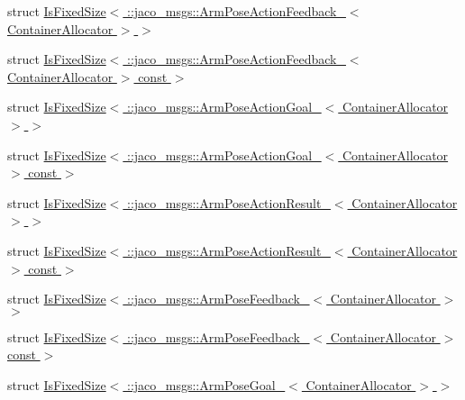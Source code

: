 \begin{DoxyCompactItemize}
\item 
struct \hyperlink{structros_1_1message__traits_1_1IsFixedSize_3_01_1_1jaco__msgs_1_1ArmPoseActionFeedback___3_01ContainerAllocator_01_4_01_4}{Is\+Fixed\+Size$<$ \+::jaco\+\_\+msgs\+::\+Arm\+Pose\+Action\+Feedback\+\_\+$<$ Container\+Allocator $>$ $>$}
\item 
struct \hyperlink{structros_1_1message__traits_1_1IsFixedSize_3_01_1_1jaco__msgs_1_1ArmPoseActionFeedback___3_01Co52ad99d0f62f41acb9d98cf1b57f7795}{Is\+Fixed\+Size$<$ \+::jaco\+\_\+msgs\+::\+Arm\+Pose\+Action\+Feedback\+\_\+$<$ Container\+Allocator $>$ const  $>$}
\item 
struct \hyperlink{structros_1_1message__traits_1_1IsFixedSize_3_01_1_1jaco__msgs_1_1ArmPoseActionGoal___3_01ContainerAllocator_01_4_01_4}{Is\+Fixed\+Size$<$ \+::jaco\+\_\+msgs\+::\+Arm\+Pose\+Action\+Goal\+\_\+$<$ Container\+Allocator $>$ $>$}
\item 
struct \hyperlink{structros_1_1message__traits_1_1IsFixedSize_3_01_1_1jaco__msgs_1_1ArmPoseActionGoal___3_01Contai6ea5b7e7c9d1480f340bdea939ca66b5}{Is\+Fixed\+Size$<$ \+::jaco\+\_\+msgs\+::\+Arm\+Pose\+Action\+Goal\+\_\+$<$ Container\+Allocator $>$ const  $>$}
\item 
struct \hyperlink{structros_1_1message__traits_1_1IsFixedSize_3_01_1_1jaco__msgs_1_1ArmPoseActionResult___3_01ContainerAllocator_01_4_01_4}{Is\+Fixed\+Size$<$ \+::jaco\+\_\+msgs\+::\+Arm\+Pose\+Action\+Result\+\_\+$<$ Container\+Allocator $>$ $>$}
\item 
struct \hyperlink{structros_1_1message__traits_1_1IsFixedSize_3_01_1_1jaco__msgs_1_1ArmPoseActionResult___3_01Cont8c30622f81558422b7a90431f8e35338}{Is\+Fixed\+Size$<$ \+::jaco\+\_\+msgs\+::\+Arm\+Pose\+Action\+Result\+\_\+$<$ Container\+Allocator $>$ const  $>$}
\item 
struct \hyperlink{structros_1_1message__traits_1_1IsFixedSize_3_01_1_1jaco__msgs_1_1ArmPoseFeedback___3_01ContainerAllocator_01_4_01_4}{Is\+Fixed\+Size$<$ \+::jaco\+\_\+msgs\+::\+Arm\+Pose\+Feedback\+\_\+$<$ Container\+Allocator $>$ $>$}
\item 
struct \hyperlink{structros_1_1message__traits_1_1IsFixedSize_3_01_1_1jaco__msgs_1_1ArmPoseFeedback___3_01ContainerAllocator_01_4_01const_01_01_4}{Is\+Fixed\+Size$<$ \+::jaco\+\_\+msgs\+::\+Arm\+Pose\+Feedback\+\_\+$<$ Container\+Allocator $>$ const  $>$}
\item 
struct \hyperlink{structros_1_1message__traits_1_1IsFixedSize_3_01_1_1jaco__msgs_1_1ArmPoseGoal___3_01ContainerAllocator_01_4_01_4}{Is\+Fixed\+Size$<$ \+::jaco\+\_\+msgs\+::\+Arm\+Pose\+Goal\+\_\+$<$ Container\+Allocator $>$ $>$}

\end{DoxyCompactItemize}
